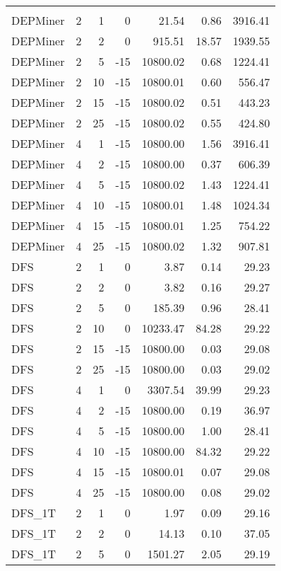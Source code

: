\begin{center}
\begin{longtable}{lrrrrrr}
\hline\endlastfoot
\\
DEPMiner     & 2 & 1 &   0 & 21.54 & 0.86 & 3916.41 \\ 
  DEPMiner     & 2 & 2 &   0 & 915.51 & 18.57 & 1939.55 \\ 
  DEPMiner     & 2 & 5 & -15 & 10800.02 & 0.68 & 1224.41 \\ 
  DEPMiner     & 2 & 10 & -15 & 10800.01 & 0.60 & 556.47 \\ 
  DEPMiner     & 2 & 15 & -15 & 10800.02 & 0.51 & 443.23 \\ 
  DEPMiner     & 2 & 25 & -15 & 10800.02 & 0.55 & 424.80 \\ 
  DEPMiner     & 4 & 1 & -15 & 10800.00 & 1.56 & 3916.41 \\ 
  DEPMiner     & 4 & 2 & -15 & 10800.00 & 0.37 & 606.39 \\ 
  DEPMiner     & 4 & 5 & -15 & 10800.02 & 1.43 & 1224.41 \\ 
  DEPMiner     & 4 & 10 & -15 & 10800.01 & 1.48 & 1024.34 \\ 
  DEPMiner     & 4 & 15 & -15 & 10800.01 & 1.25 & 754.22 \\ 
  DEPMiner     & 4 & 25 & -15 & 10800.02 & 1.32 & 907.81 \\ 
  DFS     & 2 & 1 &   0 & 3.87 & 0.14 & 29.23 \\ 
  DFS     & 2 & 2 &   0 & 3.82 & 0.16 & 29.27 \\ 
  DFS     & 2 & 5 &   0 & 185.39 & 0.96 & 28.41 \\ 
  DFS     & 2 & 10 &   0 & 10233.47 & 84.28 & 29.22 \\ 
  DFS     & 2 & 15 & -15 & 10800.00 & 0.03 & 29.08 \\ 
  DFS     & 2 & 25 & -15 & 10800.00 & 0.03 & 29.02 \\ 
  DFS     & 4 & 1 &   0 & 3307.54 & 39.99 & 29.23 \\ 
  DFS     & 4 & 2 & -15 & 10800.00 & 0.19 & 36.97 \\ 
  DFS     & 4 & 5 & -15 & 10800.00 & 1.00 & 28.41 \\ 
  DFS     & 4 & 10 & -15 & 10800.00 & 84.32 & 29.22 \\ 
  DFS     & 4 & 15 & -15 & 10800.01 & 0.07 & 29.08 \\ 
  DFS     & 4 & 25 & -15 & 10800.00 & 0.08 & 29.02 \\ 
  DFS\_1T     & 2 & 1 &   0 & 1.97 & 0.09 & 29.16 \\ 
  DFS\_1T     & 2 & 2 &   0 & 14.13 & 0.10 & 37.05 \\ 
  DFS\_1T     & 2 & 5 &   0 & 1501.27 & 2.05 & 29.19 \\ 

\end{longtable}
\end{center}

